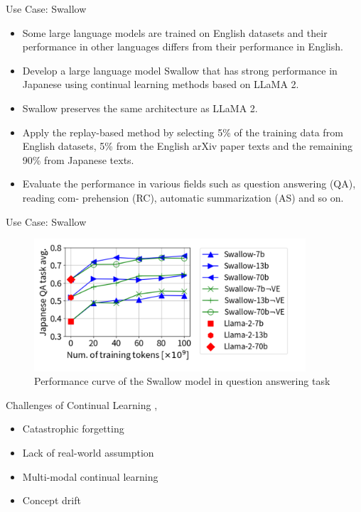 \documentclass[t]{beamer}
\begin{document}
\begin{frame}{Use Case: Swallow}
  \vspace{1cm}
  \begin{itemize}
    \item Some large language models are trained on English datasets and their performance in other languages differs from their performance in English.
    \newline
    \item Develop a large language model Swallow that has strong performance in Japanese using continual learning methods based on LLaMA 2.
    \newline
    \item Swallow preserves the same architecture as LLaMA 2.
    \newline
    \item Apply the replay-based method by selecting 5\% of the training data from English datasets, 5\% from the English arXiv paper texts and the remaining 90\% from Japanese texts.
    \newline
    \item Evaluate the performance in various fields such as question answering (QA), reading com-
    prehension (RC), automatic summarization (AS) and so on.
  \end{itemize}
\end{frame}

\begin{frame}{Use Case: Swallow}
  \begin{figure}[htbp]
    \centering
    \includegraphics[width=0.9\textwidth]{swallow.png}
    \caption{Performance curve of the Swallow model in question answering task \cite{Fujii24}}
    \label{fig:progressive}
  \end{figure}
\end{frame}

\begin{frame}{Challenges of Continual Learning \cite{Gupta23}, \cite{Yang24}}
  \vspace{1cm}
  \begin{itemize}
    \item Catastrophic forgetting
    \newline
    \item Lack of real-world assumption
    \newline
    \item Multi-modal continual learning
    \newline
    \item Concept drift
  \end{itemize}
\end{frame}
\end{document}
